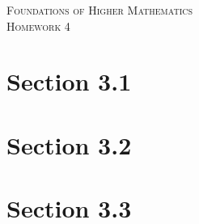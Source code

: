 \documentclass{article}
\theoremstyle{problem}
\begin{document}
\begin{center}
\textsc{\Large Foundations of Higher Mathematics}\\[.3cm]
\textsc{\Large Homework 4}
\end{center}


\section*{Section 3.1}

\section*{Section 3.2}

\section*{Section 3.3}
\end{document}
